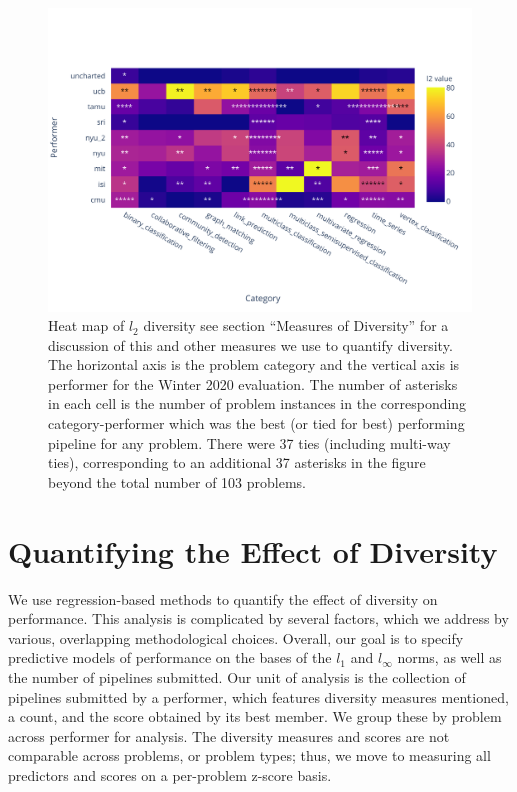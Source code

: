 \documentclass{article}
\begin{document}
\begin{figure}
\centering
\includegraphics[scale=1.3]{heatmap.pdf}
\caption{Heat map of $l_2$ diversity see section ``Measures of
  Diversity'' for a discussion of this and other measures we use to
  quantify diversity.  The horizontal axis is the problem category and
  the vertical axis is performer for the Winter 2020 evaluation.  The
  number of asterisks in each cell is the number of problem instances
  in the corresponding category-performer which was the best (or tied
  for best) performing pipeline for any problem.  There were 37 ties
  (including multi-way ties), corresponding to an additional 37
  asterisks in the figure beyond the total number of 103 problems.}
\label{fig:heatmap}
\end{figure}

\section{Quantifying the Effect of Diversity}
\label{sec:quantifying}
We use regression-based methods to quantify the effect of diversity on
performance. This analysis is complicated by several factors, which we
address by various, overlapping methodological choices. Overall, our
goal is to specify predictive models of performance on the bases of
the $l_1$ and $l_\infty$ norms, as well as the number of pipelines
submitted. Our unit of analysis is the collection of pipelines
submitted by a performer, which features diversity measures mentioned,
a count, and the score obtained by its best member. We group these by
problem across performer for analysis. The diversity measures and
scores are not comparable across problems, or problem types; thus, we
move to measuring all predictors and scores on a per-problem z-score
basis.
\end{document}
